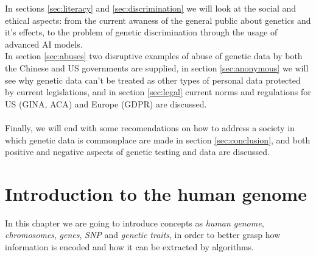 \documentclass[12pt]{article}
\begin{document}
 In sections \ref{sec:literacy} and \ref{sec:discrimination} we will look at the social and ethical aspects: from the current awaness of the general public about genetics and it's effects, to the problem of genetic discrimination 
 through the usage of advanced AI models.\\
 In section \ref{sec:abuses} two disruptive examples of abuse of genetic data by both the Chinese and US governments are supplied, in section \ref{sec:anonymous} we will see why genetic data can't be treated as 
 other types of personal data protected by current legislations, and in section \ref{sec:legal} current norms and regulations for US (GINA, ACA) and Europe (GDPR) are discussed.\\
 \\
 Finally, we will end with some recomendations on how to address a society in which genetic data is commonplace are made in section \ref{sec:conclusion}, and both positive and negative aspects of genetic testing and data are discussed.\\
\newpage
\section{Introduction to the human genome}
\label{sec:intro}
In this chapter we are going to introduce concepts as \emph{human genome}, \emph{chromosomes}, \emph{genes}, \emph{SNP} and \emph{genetic traits}, in order to better grasp how information is encoded and how it 
can be extracted by algorithms.
\end{document}
